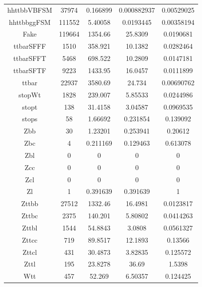 \begin{table}[]
\begin{tabular}{|c|c|c|c|c|}
hhttbbVBFSM     & 37974         & 0.166899      & 0.000882937   & 0.00529025 \\
hhttbbggFSM     & 111552        & 5.40058       & 0.0193445     & 0.00358194 \\
\hline
Fake            & 119664        & 1354.66       & 25.8309       & 0.0190681 \\
ttbarSFFF       & 1510          & 358.921       & 10.1382       & 0.0282464 \\
ttbarSFFT       & 5468          & 698.522       & 10.2809       & 0.0147181 \\
ttbarSFTF       & 9223          & 1433.95       & 16.0457       & 0.0111899 \\
ttbar           & 22937         & 3580.69       & 24.734        & 0.00690762 \\
stopWt          & 1828          & 239.007       & 5.85533       & 0.0244986 \\
stopt           & 138           & 31.4158       & 3.04587       & 0.0969535 \\
stops           & 58            & 1.66692       & 0.231854      & 0.139092 \\
Zbb             & 30            & 1.23201       & 0.253941      & 0.20612 \\
Zbc             & 4             & 0.211169      & 0.129463      & 0.613078 \\
Zbl             & 0             & 0     & 0     & 0 \\
Zcc             & 0             & 0     & 0     & 0 \\
Zcl             & 0             & 0     & 0     & 0 \\
Zl              & 1             & 0.391639      & 0.391639      & 1 \\
Zttbb           & 27512         & 1332.46       & 16.4981       & 0.0123817 \\
Zttbc           & 2375          & 140.201       & 5.80802       & 0.0414263 \\
Zttbl           & 1544          & 54.8843       & 3.0808        & 0.0561327 \\
Zttcc           & 719           & 89.8517       & 12.1893       & 0.13566 \\
Zttcl           & 431           & 30.4873       & 3.82835       & 0.125572 \\
Zttl            & 195           & 23.8278       & 36.69         & 1.5398 \\
Wtt             & 457           & 52.269        & 6.50357       & 0.124425 \\

\end{tabular}
\end{table}
